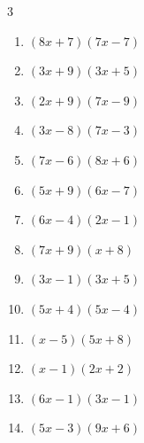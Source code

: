 \begin{multicols}{3}
\begin{enumerate}
  \item $(8x+7)(7x-7)$


  \item $(3x+9)(3x+5)$


  \item $(2x+9)(7x-9)$


  \item $(3x-8)(7x-3)$


  \item $(7x-6)(8x+6)$


  \item $(5x+9)(6x-7)$


  \item $(6x-4)(2x-1)$


  \item $(7x+9)(x+8)$


  \item $(3x-1)(3x+5)$


\columnbreak %

\resetques

  \item $(5x+4)(5x-4)$


  \item $(x-5)(5x+8)$


  \item $(x-1)(2x+2)$


  \item $(6x-1)(3x-1)$


  \item $(5x-3)(9x+6)$



\end{enumerate}
\end{multicols}

